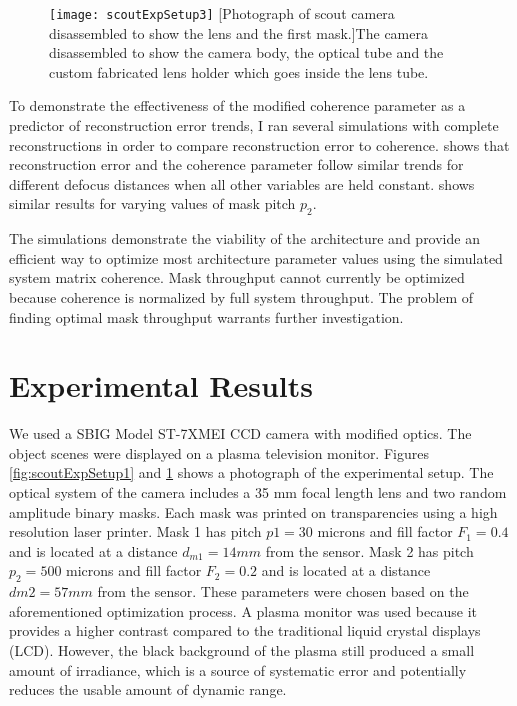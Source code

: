 \begin{figure}[!ht]
	\centering
	\texttt{[image: scoutExpSetup3]}
	[Photograph of \gls{scout} camera disassembled to show the lens and the first mask.]{The camera disassembled to show the camera body, the optical tube and the custom fabricated lens holder which goes inside the lens tube.}
	\label{fig:scoutExpSetup3}
\end{figure}

To demonstrate the effectiveness of the modified coherence parameter as a predictor of reconstruction error trends, I ran several simulations with complete reconstructions in order to compare reconstruction error to coherence.  shows that reconstruction error and the coherence parameter follow similar trends for different defocus distances when all other variables are held constant.  shows similar results for varying values of mask pitch $p_2$.

The simulations demonstrate the viability of the architecture and provide an efficient way to optimize most architecture parameter values using the simulated system matrix coherence. Mask throughput cannot currently be optimized because coherence is normalized by full system throughput. The problem of finding optimal mask throughput warrants further investigation.


\section{Experimental Results}\label{sec:ScoutExperimentalResults}

We used a SBIG Model ST-7XMEI CCD camera with modified optics. The object scenes were displayed on a plasma television monitor. Figures \ref{fig:scoutExpSetup1} and \ref{fig:scoutExpSetup3} shows a photograph of the experimental setup. The optical system of the camera includes a 35 mm focal length lens and two random amplitude binary masks. Each mask was printed on transparencies using a high resolution laser printer. Mask 1 has pitch $p1 = 30$ microns and fill factor $F_1 = 0.4$ and is located at a distance $d_{m1} = 14mm$ from the sensor. Mask 2 has pitch $p_2 = 500$ microns and fill factor $F_2 = 0.2$ and is located at a distance $dm2 = 57mm$ from the sensor. These parameters were chosen based on the aforementioned optimization process. A plasma monitor was used because it provides a higher contrast compared to the traditional liquid crystal displays (LCD). However, the black background of the plasma still produced a small amount of irradiance, which is a source of systematic error and potentially reduces the usable amount of dynamic range. 


